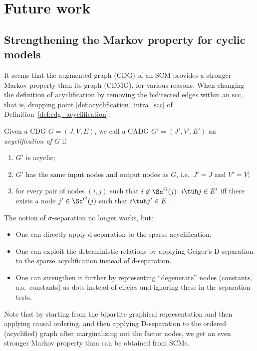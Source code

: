 \section{Future work}

\subsection{Strengthening the Markov property for cyclic models}

It seems that the augmented graph (CDG) of an SCM provides a stronger Markov property than its graph (CDMG), for various reasons.
When changing the definition of acyclification by removing the bidirected edges within an scc, that is, dropping point \ref{def:acyclification_intra_scc} of Definition~\ref{def:cdg_acyclification}:
\begin{Def}\label{def:cdg_sparse_acyclification}
  Given a CDG $G = (J, V, E)$, we call a CADG $G' = (J', V', E')$ an \emph{acyclification of $G$} if
  \begin{enumerate}[label=(\roman*)]
    \item $G'$ is acyclic;
    \item $G'$ has the same input nodes and output nodes as $G$, i.e.\ $J'=J$ and $V'=V$;
    \item for every pair of nodes $(i,j)$ such that $i \not\in\Sc^G(j)$:
      $i \tuh j \in E'$ iff there exists a node $j' \in \Sc^G(j)$ such that $i \tuh j' \in E$. \label{def:sparse_acyclification_inter_scc}
  \end{enumerate}
\end{Def}
The notion of $\sigma$-separation no longer works, but:
\begin{itemize}
  \item One can directly apply d-separation to the sparse acyclification.
  \item One can exploit the deterministic relations by applying Geiger's D-separation to the sparse acyclification instead of d-separation.
  \item One can strengthen it further by representing ``degenerate'' nodes (constants, a.s.\ constants) as dots instead of circles and ignoring these in the separation tests.
\end{itemize}
  
Note that by starting from the bipartite graphical representation and then applying causal ordering, and then applying D-separation to the ordered (acyclified) graph after marginalizing out the factor nodes, we get an even stronger Markov property than can be obtained from SCMs.

